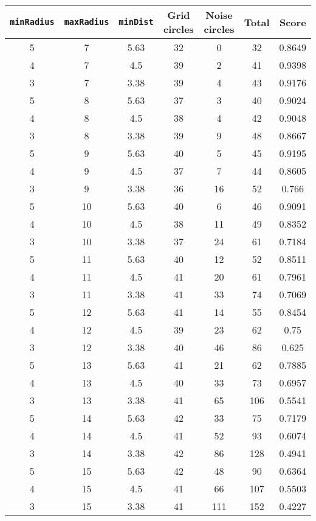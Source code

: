 \documentclass[letterpaper, 12pt]{article}
\begin{document}
\begin{longtable}{|c|c|c|c|c|c|c|}
\hline
\textbf{\texttt{minRadius}} & \textbf{\texttt{maxRadius}} & \textbf{\texttt{minDist}} & \textbf{Grid circles} & \textbf{Noise circles} & \textbf{Total} & \textbf{Score} \\
\hline
5 & 7 & 5.63 & 32 & 0 & 32 & 0.8649 \\
\hline
4 & 7 & 4.5 & 39 & 2 & 41 & 0.9398 \\
\hline
3 & 7 & 3.38 & 39 & 4 & 43 & 0.9176 \\
\hline
5 & 8 & 5.63 & 37 & 3 & 40 & 0.9024 \\
\hline
4 & 8 & 4.5 & 38 & 4 & 42 & 0.9048 \\
\hline
3 & 8 & 3.38 & 39 & 9 & 48 & 0.8667 \\
\hline
5 & 9 & 5.63 & 40 & 5 & 45 & 0.9195 \\
\hline
4 & 9 & 4.5 & 37 & 7 & 44 & 0.8605 \\
\hline
3 & 9 & 3.38 & 36 & 16 & 52 & 0.766 \\
\hline
5 & 10 & 5.63 & 40 & 6 & 46 & 0.9091 \\
\hline
4 & 10 & 4.5 & 38 & 11 & 49 & 0.8352 \\
\hline
3 & 10 & 3.38 & 37 & 24 & 61 & 0.7184 \\
\hline
5 & 11 & 5.63 & 40 & 12 & 52 & 0.8511 \\
\hline
4 & 11 & 4.5 & 41 & 20 & 61 & 0.7961 \\
\hline
3 & 11 & 3.38 & 41 & 33 & 74 & 0.7069 \\
\hline
5 & 12 & 5.63 & 41 & 14 & 55 & 0.8454 \\
\hline
4 & 12 & 4.5 & 39 & 23 & 62 & 0.75 \\
\hline
3 & 12 & 3.38 & 40 & 46 & 86 & 0.625 \\
\hline
5 & 13 & 5.63 & 41 & 21 & 62 & 0.7885 \\
\hline
4 & 13 & 4.5 & 40 & 33 & 73 & 0.6957 \\
\hline
3 & 13 & 3.38 & 41 & 65 & 106 & 0.5541 \\
\hline
5 & 14 & 5.63 & 42 & 33 & 75 & 0.7179 \\
\hline
4 & 14 & 4.5 & 41 & 52 & 93 & 0.6074 \\
\hline
3 & 14 & 3.38 & 42 & 86 & 128 & 0.4941 \\
\hline
5 & 15 & 5.63 & 42 & 48 & 90 & 0.6364 \\
\hline
4 & 15 & 4.5 & 41 & 66 & 107 & 0.5503 \\
\hline
3 & 15 & 3.38 & 41 & 111 & 152 & 0.4227 \\

\end{longtable}
\end{document}
